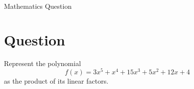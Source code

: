 \documentclass[12pt,a4paper]{article}
\begin{document}
	
	\begin{center}
		\colorbox{gray!20}{
			\parbox{0.7\textwidth}{
				\centering \Huge Mathematics Question
			}
		}
	\end{center}
	\vspace{10mm}
	
	\section*{Question}
	Represent the polynomial 
	\[
	f(x) = 3x^5 + x^4 + 15x^3 + 5x^2 + 12x + 4
	\]
	as the product of its linear factors.
	
\end{document}
